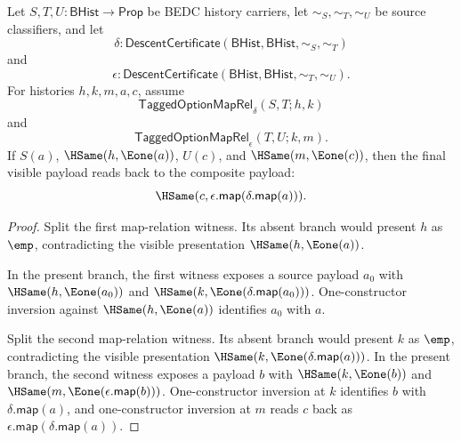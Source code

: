 \begin{theorem}
\label{thm:tagged-option-maprel-composition-visible-payload-readback}
Let $S,T,U:\mathsf{BHist}\to\mathsf{Prop}$ be BEDC history carriers, let
$\sim_S,\sim_T,\sim_U$ be source classifiers, and let
$$
\delta:\mathsf{DescentCertificate}(\mathsf{BHist},\mathsf{BHist},\sim_S,\sim_T)
$$
and
$$
\epsilon:\mathsf{DescentCertificate}(\mathsf{BHist},\mathsf{BHist},\sim_T,\sim_U).
$$
For histories $h,k,m,a,c$, assume
$$
\mathsf{TaggedOptionMapRel}_{\delta}(S,T;h,k)
$$
and
$$
\mathsf{TaggedOptionMapRel}_{\epsilon}(T,U;k,m).
$$
If $S(a)$, $\HSame(h,\Eone(a))$, $U(c)$, and
$\HSame(m,\Eone(c))$, then the final visible payload reads back to the
composite payload:
$$
\HSame(c,\epsilon.\mathsf{map}(\delta.\mathsf{map}(a))).
$$
\end{theorem}
\begin{proof}
Split the first map-relation witness. Its absent branch would present $h$ as
$\emp$, contradicting the visible presentation $\HSame(h,\Eone(a))$.

In the present branch, the first witness exposes a source payload $a_0$ with
$\HSame(h,\Eone(a_0))$ and
$\HSame(k,\Eone(\delta.\mathsf{map}(a_0)))$. One-constructor inversion against
$\HSame(h,\Eone(a))$ identifies $a_0$ with $a$.

Split the second map-relation witness. Its absent branch would present $k$ as
$\emp$, contradicting the visible presentation
$\HSame(k,\Eone(\delta.\mathsf{map}(a)))$. In the present branch, the second
witness exposes a payload $b$ with
$\HSame(k,\Eone(b))$ and
$\HSame(m,\Eone(\epsilon.\mathsf{map}(b)))$. One-constructor inversion at
$k$ identifies $b$ with $\delta.\mathsf{map}(a)$, and one-constructor
inversion at $m$ reads $c$ back as
$\epsilon.\mathsf{map}(\delta.\mathsf{map}(a))$.
\end{proof}

